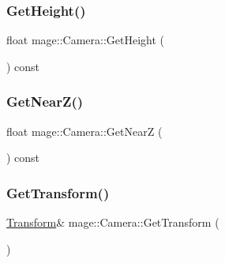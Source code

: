 \hypertarget{classmage_1_1_camera_a4c6c5e96085651ce29cd6e87543d21ec}{}\label{classmage_1_1_camera_a4c6c5e96085651ce29cd6e87543d21ec} 
\subsubsection{\texorpdfstring{Get\+Height()}{GetHeight()}}
{\footnotesize\ttfamily float mage\+::\+Camera\+::\+Get\+Height (\begin{DoxyParamCaption}{ }\end{DoxyParamCaption}) const}

\hypertarget{classmage_1_1_camera_a175e3c36526a8a3e28cd2f8bd1701c55}{}\label{classmage_1_1_camera_a175e3c36526a8a3e28cd2f8bd1701c55} 
\subsubsection{\texorpdfstring{Get\+Near\+Z()}{GetNearZ()}}
{\footnotesize\ttfamily float mage\+::\+Camera\+::\+Get\+NearZ (\begin{DoxyParamCaption}{ }\end{DoxyParamCaption}) const}

\hypertarget{classmage_1_1_camera_aaa5f4f2b5b13ffb1f70b77aec8579be5}{}\label{classmage_1_1_camera_aaa5f4f2b5b13ffb1f70b77aec8579be5} 
\subsubsection{\texorpdfstring{Get\+Transform()}{GetTransform()}\hspace{0.1cm}{\footnotesize\ttfamily [1/2]}}
{\footnotesize\ttfamily \hyperlink{structmage_1_1_transform}{Transform}\& mage\+::\+Camera\+::\+Get\+Transform (\begin{DoxyParamCaption}{ }\end{DoxyParamCaption})}

\hypertarget{classmage_1_1_camera_adac4b7ef332babf36e0c9f271f1fff76}{}\label{classmage_1_1_camera_adac4b7ef332babf36e0c9f271f1fff76} 
